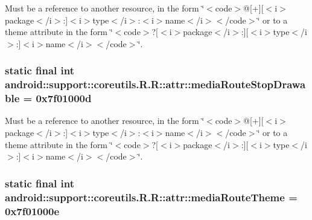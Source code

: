 Must be a reference to another resource, in the form \char`\"{}$<$code$>$@\mbox{[}+\mbox{]}\mbox{[}$<$i$>$package$<$/i$>$:\mbox{]}$<$i$>$type$<$/i$>$:$<$i$>$name$<$/i$>$$<$/code$>$\char`\"{} or to a theme attribute in the form \char`\"{}$<$code$>$?\mbox{[}$<$i$>$package$<$/i$>$:\mbox{]}\mbox{[}$<$i$>$type$<$/i$>$:\mbox{]}$<$i$>$name$<$/i$>$$<$/code$>$\char`\"{}. \hypertarget{classandroid_1_1support_1_1coreutils_1_1_r_1_1attr_eab785e8e37a17405c20b07fba1ae989}{
\subsubsection[{mediaRouteStopDrawable}]{\setlength{\rightskip}{0pt plus 5cm}static final int android::support::coreutils.R.R::attr::mediaRouteStopDrawable = 0x7f01000d}}
\label{classandroid_1_1support_1_1coreutils_1_1_r_1_1attr_eab785e8e37a17405c20b07fba1ae989}


Must be a reference to another resource, in the form \char`\"{}$<$code$>$@\mbox{[}+\mbox{]}\mbox{[}$<$i$>$package$<$/i$>$:\mbox{]}$<$i$>$type$<$/i$>$:$<$i$>$name$<$/i$>$$<$/code$>$\char`\"{} or to a theme attribute in the form \char`\"{}$<$code$>$?\mbox{[}$<$i$>$package$<$/i$>$:\mbox{]}\mbox{[}$<$i$>$type$<$/i$>$:\mbox{]}$<$i$>$name$<$/i$>$$<$/code$>$\char`\"{}. \hypertarget{classandroid_1_1support_1_1coreutils_1_1_r_1_1attr_219eedceef641d3fb686a627660bcf2f}{
\subsubsection[{mediaRouteTheme}]{\setlength{\rightskip}{0pt plus 5cm}static final int android::support::coreutils.R.R::attr::mediaRouteTheme = 0x7f01000e}}
\label{classandroid_1_1support_1_1coreutils_1_1_r_1_1attr_219eedceef641d3fb686a627660bcf2f}



